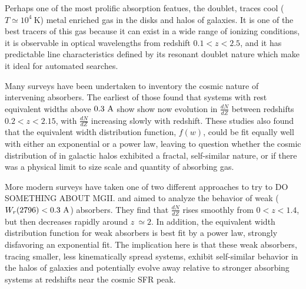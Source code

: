 \documentclass[iop,apj,numberedappendix,appendixfloats,twocolappendix]{emulateapj}
\begin{document}
Perhaps one of the most prolific absorption featues, the {\MgIIdblt} doublet, traces cool ($T \simeq 10^4~\mathrm{K}$) metal enriched gas in the disks and halos of galaxies. It is one of the best tracers of this gas because it can exist in a wide range of ionizing conditions, it is observable in optical wavelengths from redshift $0.1 < z < 2.5$, and it has predictable line characteristics defined by its resonant doublet nature which make it ideal for automated searches. 

Many surveys have been undertaken to inventory the cosmic nature of intervening {\MgII} absorbers. The earliest of those \citep{Lanzetta1987,Tytler1987,Sargent1988,Steidel1992} found that {\MgII} systems with rest equivalent widths above $0.3~\mathrm{\AA}$ show show now evolution in $\frac{dN}{dZ}$ between redshifts $0.2 < z < 2.15$, with $\frac{dN}{dZ}$ increasing slowly with redshift. These studies also found that the equivalent width distribution function, $f(w)$, could be fit equally well with either an exponential or a power law, leaving to question whether the cosmic distribution of {\MgII} in galactic halos exhibited a fractal, self-similar nature, or if there was a physical limit to size scale and quantity of {\MgII} absorbing gas. 

More modern surveys have taken one of two different approaches to try to DO SOMETHING ABOUT MGII. \cite{Churchill1999} and \cite{Narayanan2007} aimed to analyze the behavior of weak ($W_r(2796) < 0.3~\mathrm{\AA}$) {\MgII} absorbers. They find that $\frac{dN}{dZ}$ rises smoothly from $0 < z < 1.4$, but then decreases rapidly around $z~\simeq 2$. In addition, the equivalent width distribution function for weak absorbers is best fit by a power law, strongly disfavoring an exponential fit. The implication here is that these weak absorbers, tracing smaller, less kinematically spread {\MgII} systems, exhibit self-similar behavior in the halos of galaxies and potentially evolve away relative to stronger {\MgII} absorbing systems at redshifts near the cosmic SFR peak. 
\end{document}
